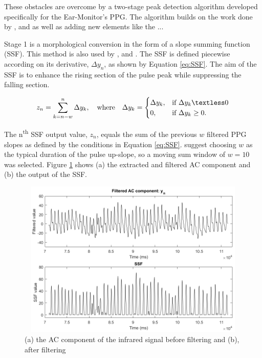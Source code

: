 \medskip

These obstacles are overcome by a two-stage peak detection algorithm developed specifically for the Ear-Monitor's PPG. The algorithm builds on the work done by \cite{park2015wearable}, \cite{zong2003open} and \cite{elgendi2013systolic} as well as adding new elements like the ...

\medskip

Stage 1 is a morphological conversion in the form of a slope summing function (SSF). This method is also used by \cite{zong2003open}, \cite{park2015wearable} and \cite{elgendi2013systolic}. The SSF is defined piecewise according on its derivative, $\Delta y_n$,  as shown by Equation \ref{eq:SSF}. The aim of the SSF is to enhance the rising section of the pulse peak while suppressing the falling section.

\begin{equation}
\label{eq:SSF}
z_n = \sum\limits_{k=n-w}^n \Delta y_k, \quad \text{where} \quad \Delta y_k=
\begin{cases}
\Delta y_k, 	&\text{if } \Delta y_k \textless	0 \\
0, 				&\text{if } \Delta y_k \geq			0. 
\end{cases}
\end{equation}

The n\textsuperscript{th} SSF output value, $z_n$,  equals the sum of the previous $w$ filtered PPG slopes as defined by the conditions in Equation \ref{eq:SSF}. \cite{zong2003open} suggest choosing $w$ as the typical duration of the pulse up-slope, so a moving sum window of $w=10$ was selected. Figure \ref{fig:SSF} shows (a) the extracted  and filtered AC component and (b) the output of the SSF.

\begin{figure}[H]
   \centering
   \includegraphics[width=12cm,height=7.5cm]{figs/SSF.png}
   \caption{(a) the AC component of the infrared signal before filtering and (b), after filtering}
   \label{fig:SSF}
\end{figure}

